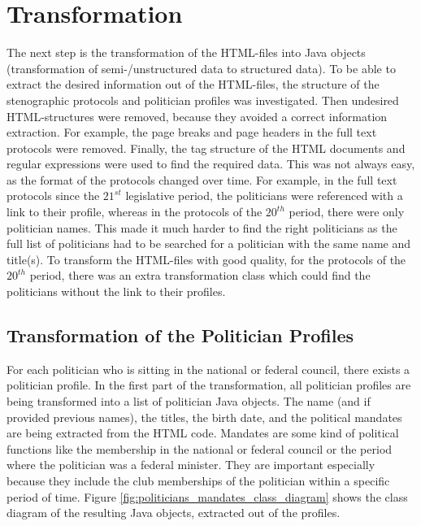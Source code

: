 \section{Transformation}
\label{sec:transformation}
The next step is the transformation of the HTML-files into Java objects (transformation of semi-/unstructured data to structured data). To be able to extract the desired information out of the HTML-files, the structure of the stenographic protocols and politician profiles was investigated. Then undesired HTML-structures were removed, because they avoided a correct information extraction. For example, the page breaks and page headers in the full text protocols were removed. Finally, the tag structure of the HTML documents and regular expressions were used to find the required data. 
This was not always easy, as the format of the protocols changed over time. For example, in the full text protocols since the $21^{st}$ legislative period, the politicians were referenced with a link to their profile, whereas in the protocols of the $20^{th}$ period, there were only politician names. This made it much harder to find the right politicians as the full list of politicians had to be searched for a politician with the same name and title(s). To transform the HTML-files with good quality, for the protocols of the $20^{th}$ period, there was an extra transformation class which could find the politicians without the link to their profiles.

\subsection{Transformation of the Politician Profiles}
For each politician who is sitting in the national or federal council, there exists a politician profile. In the first part of the transformation, all politician profiles are being transformed into a list of politician Java objects. The name (and if provided previous names), the titles, the birth date, and the political mandates are being extracted from the HTML code. Mandates are some kind of political functions like the membership in the national or federal council or the period where the politician was a federal minister. They are important especially because they include the club memberships of the politician within a specific period of time. 
Figure \ref{fig:politicians_mandates_class_diagram} shows the class diagram of the resulting Java objects, extracted out of the profiles.

